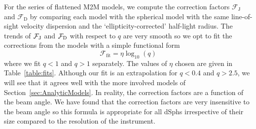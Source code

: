 \documentclass[prd,twocolumn,showpacs,preprintnumbers,superscriptaddress,nofootinbib,amsmath,amssymb,nobalancelastpage]{revtex4}
\newcommand{\Df}{{\rm D}}
\newcommand{\Jf}{{\rm J}}
\begin{document}
For the series of flattened M2M models, we compute the correction factors $\mathcal{F}_\mathrm{J}$ and $\mathcal{F}_\mathrm{D}$ by comparing each model with the spherical model with the same line-of-sight velocity dispersion and the `ellipticity-corrected' half-light radius. The trends of $\mathcal{F}_{\Jf}$ and $\mathcal{F}_{\Df}$ with respect to $q$ are very smooth so
we opt to fit the corrections from the models with a simple functional
form
%
\begin{equation}
\mathcal{F}_{\mathrm{fit}} = \eta\log_{10}(q)
\label{eq::simple_fit}
\end{equation}
%
where we fit $q<1$ and $q>1$ separately. The values of $\eta$ chosen are given in
Table~\ref{table:fits}. Although our fit is an extrapolation for
$q<0.4$ and $q>2.5$, we will see that it agrees well with the more
involved models of Section~\ref{sec:AnalyticModels}. In reality, the correction factors are a function of the beam angle. We have found that the correction factors are very insensitive to the beam angle so this formula is appropriate for all dSphs irrespective of their size compared to the resolution of the instrument.
\end{document}
